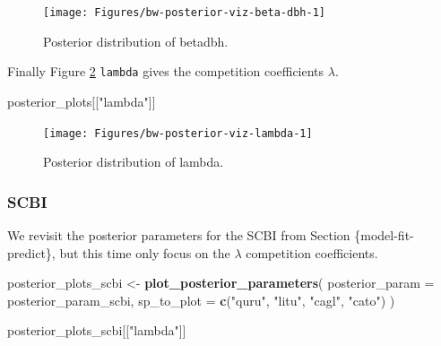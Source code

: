 \documentclass[12pt]{article}
\newenvironment{Shaded}{\begin{snugshade}}{\end{snugshade}}
\newcommand{\DataTypeTok}[1]{\textcolor[rgb]{0.13,0.29,0.53}{#1}}
\newcommand{\KeywordTok}[1]{\textcolor[rgb]{0.13,0.29,0.53}{\textbf{#1}}}
\newcommand{\NormalTok}[1]{#1}
\newcommand{\StringTok}[1]{\textcolor[rgb]{0.31,0.60,0.02}{#1}}
\begin{document}
\begin{figure}

{\centering \texttt{[image: Figures/bw-posterior-viz-beta-dbh-1]} 

}

\caption{Posterior distribution of betadbh.}\label{fig:bw-posterior-viz-beta-dbh}
\end{figure}

Finally Figure \ref{fig:bw-posterior-viz-lambda} \texttt{lambda} gives
the competition coefficients \(\lambda\).

\begin{Shaded}
\begin{Highlighting}[]
\NormalTok{posterior_plots[[}\StringTok{"lambda"}\NormalTok{]]}
\end{Highlighting}
\end{Shaded}

\begin{figure}

{\centering \texttt{[image: Figures/bw-posterior-viz-lambda-1]} 

}

\caption{Posterior distribution of lambda.}\label{fig:bw-posterior-viz-lambda}
\end{figure}

\hypertarget{scbi-5}{%
\subsubsection{SCBI}\label{scbi-5}}

We revisit the posterior parameters for the SCBI from Section
\{model-fit-predict\}, but this time only focus on the \(\lambda\)
competition coefficients.

\begin{Shaded}
\begin{Highlighting}[]
\NormalTok{posterior_plots_scbi <-}\StringTok{ }\KeywordTok{plot_posterior_parameters}\NormalTok{(}
  \DataTypeTok{posterior_param =}\NormalTok{ posterior_param_scbi,}
  \DataTypeTok{sp_to_plot =} \KeywordTok{c}\NormalTok{(}\StringTok{"quru"}\NormalTok{, }\StringTok{"litu"}\NormalTok{, }\StringTok{"cagl"}\NormalTok{, }\StringTok{"cato"}\NormalTok{)}
\NormalTok{)}
\end{Highlighting}
\end{Shaded}

\begin{Shaded}
\begin{Highlighting}[]
\NormalTok{posterior_plots_scbi[[}\StringTok{"lambda"}\NormalTok{]]}
\end{Highlighting}
\end{Shaded}
\end{document}
